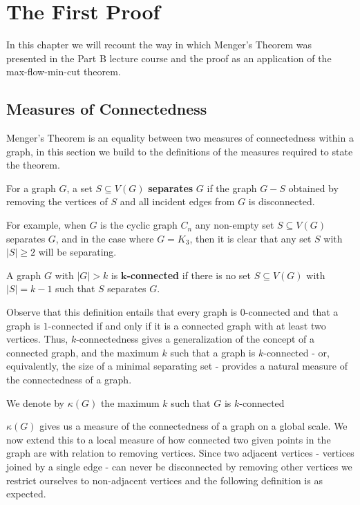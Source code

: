 \chapter{The First Proof}

In this chapter we will recount the way in which Menger's Theorem was presented in the Part B lecture course and the proof as an application of the max-flow-min-cut theorem.

\section{Measures of Connectedness}

Menger's Theorem is an equality between two measures of connectedness within a graph, in this section we build to the definitions of the measures required to state the theorem.

\begin{defn}
For a graph $G$, a set $S \subseteq V(G)$ \textbf{separates} $G$ if the graph $G-S$ obtained by removing the vertices of $S$ and all incident edges from $G$ is disconnected.
\end{defn}

For example, when $G$ is the cyclic graph $C_n$ any non-empty set $S \subseteq V(G)$ separates $G$, and in the case where $G = K_3$, then it is clear that any set $S$ with $|S| \geq 2$ will be separating.

\begin{defn}
A graph $G$ with $|G| > k$ is $\boldsymbol{k}$\textbf{-connected} if there is no set $S \subseteq V(G)$ with $|S| = k - 1$ such that $S$ separates $G$.
\end{defn}

Observe that this definition entails that every graph is $0$-connected and that a graph is $1$-connected if and only if it is a connected graph with at least two vertices. Thus, $k$-connectedness gives a generalization of the concept of a connected graph, and the maximum $k$ such that a graph is $k$-connected - or, equivalently, the size of a minimal separating set - provides a natural measure of the connectedness of a graph. 

\begin{notat}
We denote by $\kappa(G)$ the maximum $k$ such that $G$ is $k$-connected
\end{notat}

$\kappa(G)$ gives us a measure of the connectedness of a graph on a global scale. We now extend this to a local measure of how connected two given points in the graph are with relation to removing vertices. Since two adjacent vertices - vertices joined by a single edge - can never be disconnected by removing other vertices we restrict ourselves to non-adjacent vertices and the following definition is as expected.

